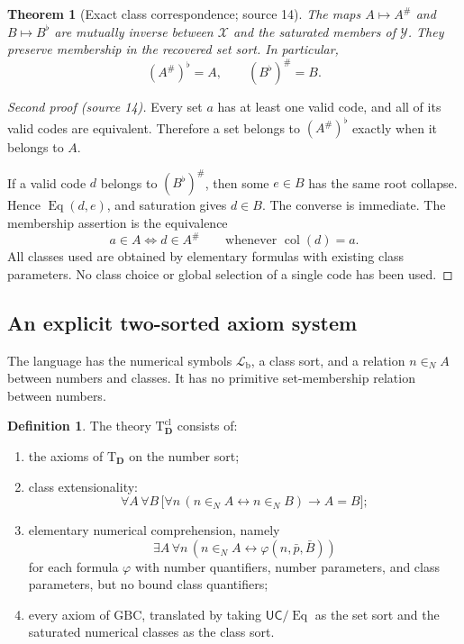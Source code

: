\documentclass[11pt,letterpaper]{article}
\newtheorem{theorem}{Theorem}[section]
\theoremstyle{definition}
\newtheorem{definition}[definition]{Definition}\aliascntresetthe{definition}
\theoremstyle{remark}
\newcommand{\GBC}{\mathrm{GBC}}
\newcommand{\Eqc}{\operatorname{Eq}}
\newcommand{\UC}{\mathsf{UC}}
\newcommand{\Dd}{\mathbf{D}}
\newcommand{\Lb}{\mathcal L_{\mathrm b}}
\newcommand{\Tth}{\mathrm{T}}
\begin{document}
\begin{theorem}[Exact class correspondence; source 14]\label{hset:sf:thm:classcorr}
The maps $A\mapsto A^\#$ and $B\mapsto B^\flat$ are mutually inverse between
$\mathcal X$ and the saturated members of $\mathcal Y$. They preserve membership in
the recovered set sort. In particular,
\[
 (A^\#)^\flat=A,\qquad(B^\flat)^\#=B.
\]
\end{theorem}
\begin{proof}[Second proof (source 14)]
Every set $a$ has at least one valid code, and all of its valid codes are
equivalent. Therefore a set belongs to $(A^\#)^\flat$ exactly when it belongs to
$A$.

If a valid code $d$ belongs to $(B^\flat)^\#$, then some $e\in B$ has the same root
collapse. Hence $\Eqc(d,e)$, and saturation gives $d\in B$. The converse is
immediate. The membership assertion is the equivalence
\[
 a\in A\iff d\in A^\#\qquad\text{whenever }\operatorname{col}(d)=a.
\]
All classes used are obtained by elementary formulas with existing class
parameters. No class choice or global selection of a single code has been used.
\end{proof}

\subsection{An explicit two-sorted axiom system}

The language has the numerical symbols $\Lb$, a class sort, and a relation
$n\in_N A$ between numbers and classes. It has no primitive set-membership relation
between numbers.

\begin{definition}\label{hset:sf:def:classaxioms}
The theory $\Tth^{\mathrm{cl}}_{\Dd}$ consists of:
\begin{enumerate}
\item the axioms of $\Tth_{\Dd}$ on the number sort;
\item class extensionality:
\[
 \forall A\,\forall B\,\bigl[\forall n\,(n\in_N A\leftrightarrow n\in_N B)\to A=B\bigr];
\]
\item elementary numerical comprehension, namely
\[
 \exists A\,\forall n\,(n\in_N A\leftrightarrow\varphi(n,\bar p,\bar B))
\]
for each formula $\varphi$ with number quantifiers, number parameters, and class
parameters, but no bound class quantifiers;
\item every axiom of $\GBC$, translated by taking $\UC/{\Eqc}$ as the set sort and
the saturated numerical classes as the class sort.
\end{enumerate}
\end{definition}
\end{document}
